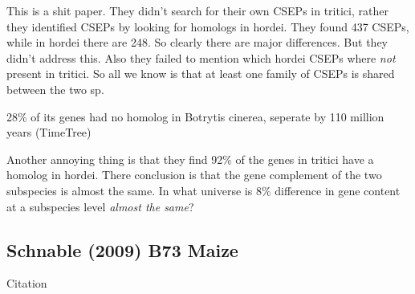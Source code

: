 
  This is a shit paper. They didn't search for their own CSEPs in tritici,
  rather they identified CSEPs by looking for homologs in hordei.  They found
  437 CSEPs, while in hordei there are 248. So clearly there are major
  differences. But they didn't address this. Also they failed to mention
  which hordei CSEPs where \textit{not} present in tritici. So all we know is
  that at least one family of CSEPs is shared between the two sp.

  28\% of its genes had no homolog in Botrytis cinerea, seperate by 110 million years (TimeTree)

  Another annoying thing is that they find 92\% of the genes in tritici have
  a homolog in hordei. There conclusion is that the gene complement of the
  two subspecies is almost the same. In what universe is 8\% difference in
  gene content at a subspecies level \textit{almost the same}?

\subsection{Schnable (2009) B73 Maize}
  Citation \cite{schnable_b73_2009}

